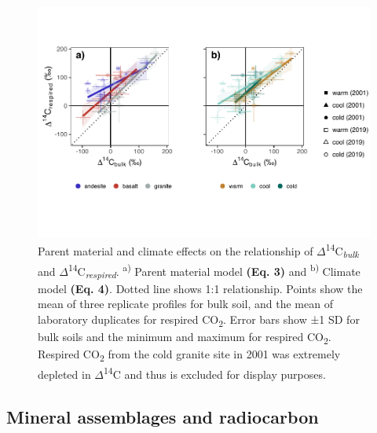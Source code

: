 \documentclass[english,man,floatsintext]{apa6}
\begin{document}
\begin{figure}

{\centering \includegraphics{sra-blk-inc-19_files/figure-latex/blk-inc-plots-1} 

}

\caption{Parent material and climate effects on the relationship of \(\Delta\)\textsuperscript{14}C\textsubscript{\emph{bulk}} and \(\Delta\)\textsuperscript{14}C\textsubscript{\emph{respired}}. \textsuperscript{a)} Parent material model \textbf{(Eq. 3)} and \textsuperscript{b)} Climate model \textbf{(Eq. 4)}. Dotted line shows 1:1 relationship. Points show the mean of three replicate profiles for bulk soil, and the mean of laboratory duplicates for respired CO\textsubscript{2}. Error bars show ±1 SD for bulk soils and the minimum and maximum for respired CO\textsubscript{2}. Respired CO\textsubscript{2} from the cold granite site in 2001 was extremely depleted in \(\Delta\)\textsuperscript{14}C and thus is excluded for display purposes.}\label{fig:blk-inc-plots}
\end{figure}

\hypertarget{mineral-assemblages-and-radiocarbon}{%
\subsection{Mineral assemblages and radiocarbon}\label{mineral-assemblages-and-radiocarbon}}
\end{document}

